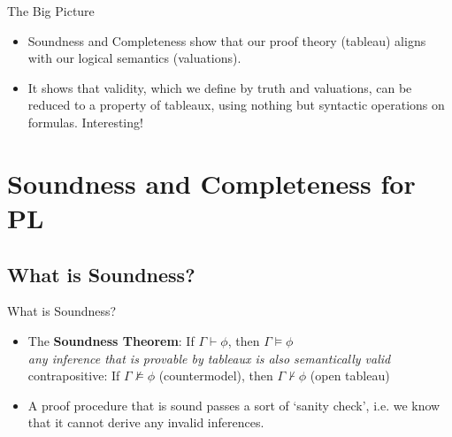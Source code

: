 \begin{frame}{The Big Picture}

\begin{itemize}%
\itemsep=16pt
		
\item Soundness and Completeness show that our proof theory (tableau) aligns with our logical semantics (valuations).

\item It shows that validity, which we define by truth and valuations, can be reduced to a property of tableaux, using nothing but syntactic operations on formulas. Interesting!

\end{itemize} 

\end{frame}

\section{Soundness and Completeness for PL}
\subsection{What is Soundness?}
\begin{frame}{What is Soundness?}

	\begin{itemize}%
	\itemsep=16pt
		
        \item The \textbf{Soundness Theorem}: If $\Gamma\vdash\phi$, then $\Gamma\vDash\phi$
	\\
	\alert{\emph{\small{any inference that is provable by tableaux is also semantically valid}}}
	\\
	{\small contrapositive: If $\Gamma\nvDash\phi$ (countermodel), then $\Gamma\nvdash\phi$ (open tableau)}
	
	\item A proof procedure that is sound passes a sort of `sanity check', i.e. we know that it cannot derive any invalid inferences.
	
	\end{itemize}

\end{frame}

